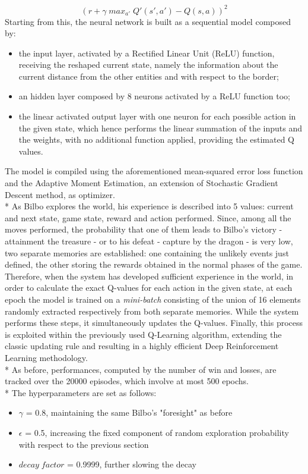 $$(r+\gamma\;max_{a'}\;Q'(s',a')-Q(s,a))^2$$
Starting from this, the neural network is built as a sequential model composed by:
\begin{itemize}
  \item the input layer, activated by a Rectified Linear Unit (ReLU) function, receiving the reshaped current state, namely the information about the current distance from the other entities and with respect to the border; 
  \item an hidden layer composed by 8 neurons activated by a ReLU function too;
  \item the linear activated output layer with one neuron for each possible action in the given state, which hence performs the linear summation of the inputs and the weights, with no additional function applied, providing the estimated Q values.
\end{itemize}
The model is compiled using the aforementioned mean-squared error loss function and the Adaptive Moment Estimation, an extension of Stochastic Gradient Descent method, as optimizer.\\*
As Bilbo explores the world, his experience is described into 5 values: current and next state, game state, reward and action performed. Since, among all the moves performed, the probability that one of them leads to Bilbo's victory - attainment the treasure - or to his defeat - capture by the dragon - is very low, two separate memories are established: one containing the unlikely events just defined, the other storing the rewards obtained in the normal phases of the game. Therefore, when the system has developed sufficient experience in the world, in order to calculate the exact Q-values for each action in the given state, at each epoch the model is trained on a \textit{mini-batch} consisting of the union of 16 elements randomly extracted respectively from both separate memories. While the system performs these steps, it simultaneously updates the Q-values. Finally, this process is exploited within the previously used Q-Learning algorithm, extending the classic updating rule and resulting in a highly efficient Deep Reinforcement Learning methodology.\\*
As before, performances, computed by the number of win and losses, are tracked over the 20000 episodes, which involve at most 500 epochs.\\*
The hyperparameters are set as follows:
\begin{itemize}
  \item $\gamma$ = 0.8, maintaining the same Bilbo's "foresight" as before
  \item $\epsilon$ = 0.5, increasing the fixed component of random exploration probability with respect to the previous section
  \item $decay\;factor$ = 0.9999, further slowing the decay
\end{itemize} 

